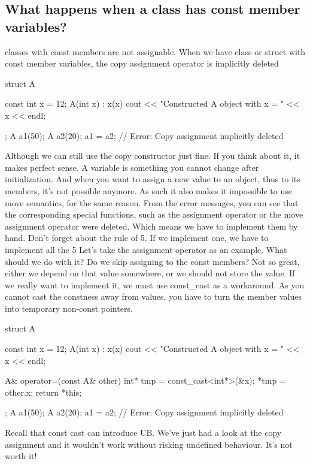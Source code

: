 \documentclass{report}
\begin{document}
\subsection{What happens when a class has const member variables?}
\bigbreak \noindent 
classes with const members are not assignable. When we have class or struct with const member variables, the copy assignment operator is implicitly deleted
\bigbreak \noindent 
\begin{cppcode}
    struct A {
        const int x = 12;
        A(int x) : x(x) { cout << "Constructed A object with x = " << x << endl; } 

    };
    A a1(50);
    A a2(20);
    a1 = a2; // Error: Copy assignment implicitly deleted
\end{cppcode}
\bigbreak \noindent 
Although we can still use the copy constructor just fine.
\bigbreak \noindent 
If you think about it, it makes perfect sense. A variable is something you cannot change after initialization. And when you want
to assign a new value to an object, thus to its members, it’s not
possible anymore.
\bigbreak \noindent 
As such it also makes it impossible to use move semantics, for the
same reason.
\bigbreak \noindent 
From the error messages, you can see that the corresponding special
functions, such as the assignment operator or the move assignment
operator were deleted. Which means we have to implement them
by hand. Don’t forget about the rule of 5. If we implement one,
we have to implement all the 5
\bigbreak \noindent 
Let’s take the assignment operator as an example. What should we
do with it?
\bigbreak \noindent 
Do we skip assigning to the const members? Not so great, either we
depend on that value somewhere, or we should not store the value.
\bigbreak \noindent 
If we really want to implement it, we must use const\_cast as a
workaround. As you cannot cast the constness away from values,
you have to turn the member values into temporary non-const
pointers.
\bigbreak \noindent 
\begin{cppcode}
    struct A {
        const int x = 12;
        A(int x) : x(x) { cout << "Constructed A object with x = " << x << endl; } 

        A& operator=(const A& other) {
            int* tmp = const_cast<int*>(&x);
            *tmp = other.x;
            return *this;
        }
    };
    A a1(50);
    A a2(20);
    a1 = a2; // Error: Copy assignment implicitly deleted
\end{cppcode}
\bigbreak \noindent 
Recall that const cast can introduce UB. We’ve just had a look at the copy assignment and it wouldn’t work
without risking undefined behaviour.
\bigbreak \noindent 
It’s not worth it!
\end{document}
